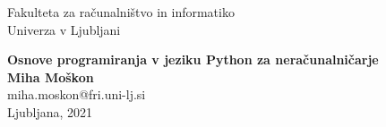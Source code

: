 \clearpage
\begin{center}
{\small Fakulteta za računalništvo in informatiko \\
 Univerza v Ljubljani\\}
\vspace{5cm}

 {\huge\bfseries\sffamily\color{chapter_col} Osnove programiranja v jeziku Python za neračunalničarje\\}
 \vspace{3cm}
 {\large\bfseries Miha Moškon}\\[5pt]
 miha.moskon@fri.uni-lj.si\\[14pt]
  \vspace{2cm}
 \vfill
{Ljubljana, 2021}
\end{center}
\thispagestyle{empty}
